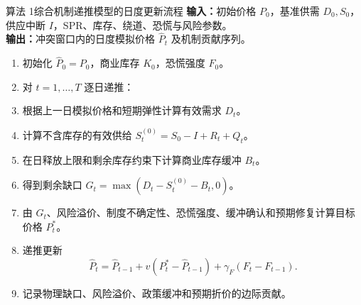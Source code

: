 \begin{paperalgobox}{算法 1\quad 综合机制递推模型的日度更新流程}
\textbf{输入：}初始价格 \(P_0\)，基准供需 \(D_0,S_0\)，供应中断 \(I\)，SPR、库存、绕道、恐慌与风险参数。\\
\textbf{输出：}冲突窗口内的日度模拟价格 \(\hat P_t\) 及机制贡献序列。

\begin{enumerate}[leftmargin=2.2em,itemsep=0.25em,topsep=0.45em,label=\arabic*.]
  \item 初始化 \(\hat P_0=P_0\)，商业库存 \(K_0\)，恐慌强度 \(F_0\)。
  \item 对 \(t=1,\ldots,T\) 逐日递推：
  \item 根据上一日模拟价格和短期弹性计算有效需求 \(D_t\)。
  \item 计算不含库存的有效供给 \(S_t^{(0)}=S_0-I+R_t+Q_t\)。
  \item 在日释放上限和剩余库存约束下计算商业库存缓冲 \(B_t\)。
  \item 得到剩余缺口 \(G_t=\max(D_t-S_t^{(0)}-B_t,0)\)。
  \item 由 \(G_t\)、风险溢价、制度不确定性、恐慌强度、缓冲确认和预期修复计算目标价格 \(P_t^\ast\)。
  \item 递推更新
  \[
    \hat P_t=\hat P_{t-1}+v(P_t^\ast-\hat P_{t-1})+\gamma_F(F_t-F_{t-1}) .
  \]
  \item 记录物理缺口、风险溢价、政策缓冲和预期折价的边际贡献。
\end{enumerate}
\end{paperalgobox}
